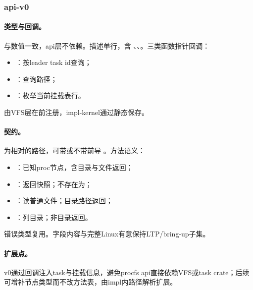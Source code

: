 
\subsubsection{api-v0}

\paragraph{类型与回调。}
与数值一致，api层不依赖。描述单行，含 、、。三类函数指针回调：
\begin{itemize}
 \item {}：按leader task id查询；
 \item {}：查询路径；
 \item {}：枚举当前挂载表行。
\end{itemize}
由VFS层在前注册，impl-kernel通过静态保存。

\paragraph{契约。}
为相对的路径，可带或不带前导 \code{/}。方法语义：
\begin{itemize}
 \item {}：已知proc节点，含目录与文件返回；
 \item {}：返回快照；不存在为；
 \item {}：读普通文件；目录路径返回；
 \item {}：列目录；非目录返回。
\end{itemize}
错误类型复用。字段内容与完整Linux有意保持LTP/bring-up子集。

\paragraph{扩展点。}
v0通过回调注入task与挂载信息，避免procfs api直接依赖VFS或task crate；后续可增补节点类型而不改方法表，由impl内路径解析扩展。
